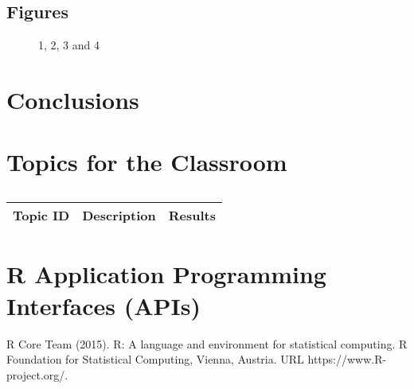 \subsection{Figures}

\begin{figure}[H]
	\centering
	\begin{minipage}[b]{0.5\linewidth}
	\end{minipage}\hfill
	\begin{minipage}[b]{0.5\linewidth}
	\end{minipage}\hfill	
	\begin{minipage}[b]{0.5\linewidth}
	\end{minipage}\hfill
	\begin{minipage}[b]{0.5\linewidth}
	\end{minipage}\hfill
	\caption{1, 2, 3 and 4}
	\label{fig:Figure1}
\end{figure} 


\section{Conclusions}


\section{Topics for the Classroom}

\centering	
\begin{table}[H]\tiny
	\caption{}	
	\begin{tabular}{r|p{4cm}|l}
		\hline	
		Topic ID & Description & Results \\
		\hline 
		\hline 
	\end{tabular}
\end{table}

\section{R Application Programming Interfaces (APIs)}





\begin{thebibliography}{00}

R Core Team (2015). 
\newblock R: A language and environment for statistical computing. R Foundation for Statistical Computing, Vienna, Austria.
\newblock URL https://www.R-project.org/.

\end{thebibliography}

